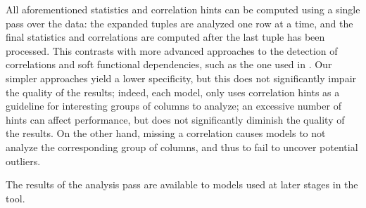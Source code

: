 All aforementioned statistics and correlation hints can be computed using a single pass over the data: the expanded tuples are analyzed one row at a time, and the final statistics and correlations are computed after the last tuple has been processed. This contrasts with more advanced approaches to the detection of correlations and soft functional dependencies, such as the one used in \cite{Ilyas2004}. Our simpler approaches yield a lower specificity, but this does not significantly impair the quality of the results; indeed, each model, only uses correlation hints as a guideline for interesting groups of columns to analyze; an excessive number of hints can affect performance, but does not significantly diminish the quality of the results. On the other hand, missing a correlation causes models to not analyze the corresponding group of columns, and thus to fail to uncover potential outliers.

The results of the analysis pass are available to models used at later stages in the tool.
